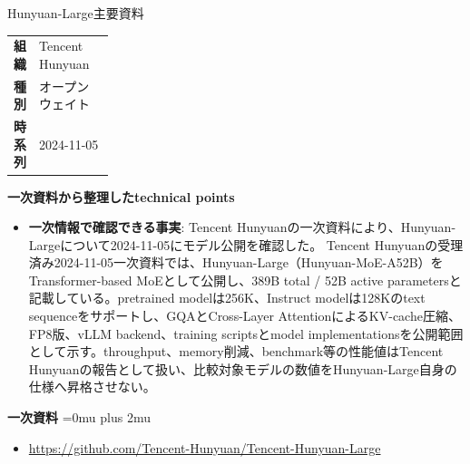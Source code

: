 \begin{technicalnote}{Hunyuan-Large}{主要資料}
\begingroup
\begin{tabularx}{\linewidth}{@{}>{\bfseries}p{0.22\linewidth}X@{}}
組織 & Tencent Hunyuan \\
種別 & オープンウェイト \\
時系列 & 2024-11-05 \\
\end{tabularx}
\smallskip
{\bfseries 一次資料から整理したtechnical points}
\begin{itemize}[leftmargin=1.5em,itemsep=0.35em]
\item \textbf{一次情報で確認できる事実}: Tencent Hunyuanの一次資料により、Hunyuan-Largeについて2024-11-05にモデル公開を確認した。 Tencent Hunyuanの受理済み2024-11-05一次資料では、Hunyuan-Large（Hunyuan-MoE-A52B）をTransformer-based MoEとして公開し、389B total / 52B active parametersと記載している。pretrained modelは256K、Instruct modelは128Kのtext sequenceをサポートし、GQAとCross-Layer AttentionによるKV-cache圧縮、FP8版、vLLM backend、training scriptsとmodel implementationsを公開範囲として示す。throughput、memory削減、benchmark等の性能値はTencent Hunyuanの報告として扱い、比較対象モデルの数値をHunyuan-Large自身の仕様へ昇格させない。
\end{itemize}
\begin{minipage}{\linewidth}
\begin{samepage}
{\bfseries 一次資料}
\begingroup\sloppy
\Urlmuskip=0mu plus 2mu\relax
\begin{itemize}[leftmargin=1.5em,itemsep=0.25em]
\item {\scriptsize\url{https://github.com/Tencent-Hunyuan/Tencent-Hunyuan-Large}}
\end{itemize}
\endgroup
\end{samepage}
\end{minipage}
\endgroup
\end{technicalnote}
\medskip


